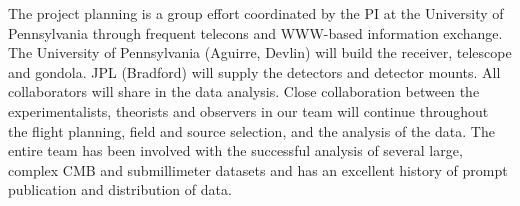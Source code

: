 The project planning is a group effort coordinated by the PI at the
University of Pennsylvania through frequent telecons and WWW-based
information exchange.  The University of Pennsylvania (Aguirre,
Devlin) will build the receiver, telescope and gondola.  JPL
(Bradford) will supply the detectors and detector mounts.  
All collaborators will share in the data analysis.  Close
collaboration between the experimentalists, theorists and observers in
our team will continue throughout the flight planning, field and
source selection, and the analysis of the data.  The entire team has
been involved with the successful analysis of several large, complex
CMB and submillimeter datasets and has an excellent history of prompt
publication and distribution of data.

